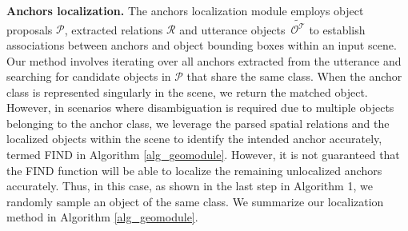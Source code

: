 \noindent \textbf{Anchors localization.} 
The anchors localization module employs object proposals $\mathcal{P}$, extracted relations $\mathcal{R}$ and utterance objects\ $\widetilde{\mathcal{O^T}}$ to establish associations between anchors and object bounding boxes within an input scene. Our method involves iterating over all anchors extracted from the utterance and searching for candidate objects in $\mathcal{P}$ that share the same class. 
When the anchor class is represented singularly in the scene, we return the matched object. However, in scenarios where disambiguation is required due to multiple objects belonging to the anchor class, we leverage the parsed spatial relations and the localized objects within the scene to identify the intended anchor accurately, termed FIND in Algorithm \ref{alg_geomodule}.
However, it is not guaranteed that the FIND function will be able to localize the remaining unlocalized anchors accurately.
Thus, in this case, as shown in the last step in Algorithm 1, we randomly sample an object of the same class.
We summarize our localization method in Algorithm \ref{alg_geomodule}.

